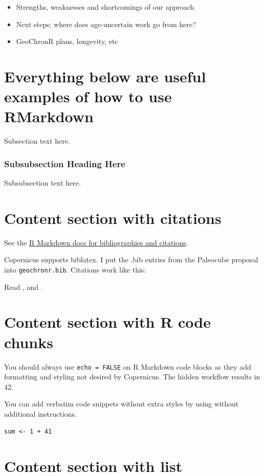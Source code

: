 \documentclass[gc, manuscript]{copernicus}
\begin{document}
\begin{itemize}
\item
  Strengths, weaknesses and shortcomings of our approach
\item
  Next steps; where does age-uncertain work go from here?
\item
  GeoChronR plans, longevity, etc
\end{itemize}

\section{Everything below are useful examples of how to use RMarkdown}

Subsection text here.

\subsubsection{Subsubsection Heading Here}

Subsubsection text here.

\section{Content section with citations}

See the
\href{http://rmarkdown.rstudio.com/authoring_bibliographies_and_citations.html}{R
Markdown docs for bibliographies and citations}.

Copernicus supports biblatex. I put the .bib entries from the Paleocube
proposal into \texttt{geochronr.bib}. Citations work like this:

Read \citep{Evans_QSR13}, and \citep[see][]{PRYSM}.

\section{Content section with R code chunks}

You should always use \texttt{echo\ =\ FALSE} on R Markdown code blocks
as they add formatting and styling not desired by Copernicus. The hidden
workflow results in 42.

You can add verbatim code snippets without extra styles by using
\texttt{\textasciigrave{}\textasciigrave{}\textasciigrave{}} without
additional instructions.

\begin{verbatim}
sum <- 1 + 41
\end{verbatim}

\section{Content section with list}
\end{document}
